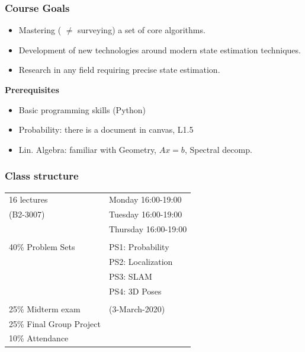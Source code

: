 \documentclass[xetex,mathserif,serif]{beamer} %
\begin{document}
\begin{frame}
\frametitle{Course Goals}

\begin{itemize}
\item Mastering ( $\neq$ surveying) a set of core algorithms.
\item Development of new technologies around modern state estimation techniques.
\item Research in any field requiring precise state estimation.
\end{itemize}

\pause
\vspace{5mm}
\begin{center}
{\bf Prerequisites}
\end{center}

\begin{itemize}
\item Basic programming skills (Python)
\item Probability: there is a document in canvas, L1.5
\item Lin. Algebra: familiar with Geometry, $Ax=b$, Spectral decomp.
\end{itemize}


\end{frame}

\begin{frame}
\frametitle{Class structure}

\begin{tabular}{ l l }
  16 lectures & Monday  16:00-19:00  \\
  (B2-3007)   & Tuesday 16:00-19:00 \\
              & Thursday 16:00-19:00 \\
              \\
  40\% Problem Sets & PS1: Probability  \\
  & PS2: Localization \\
   & PS3: SLAM  \\
   & PS4: 3D Poses\\ 
   \\
   25\% Midterm exam & (3-March-2020) \\
  25\% Final Group Project &  \\
  10\% Attendance
    
\end{tabular}

\end{frame}
\end{document}
